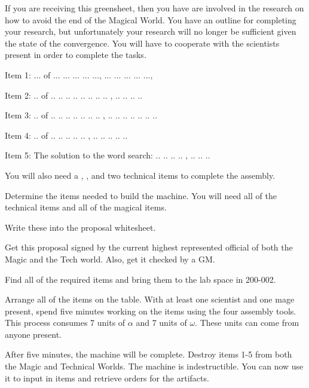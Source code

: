 \documentclass[green]{guildcamp3}
\begin{document}
\name{\gSaveTheWorldMages{}}






If you are receiving this greensheet, then you have are involved in the research on how to avoid the end of the Magical World. You have an outline for completing your research, but unfortunately your research will no longer be sufficient given the state of the convergence. You will have to cooperate with the scientists present in order to complete the tasks. 

Item 1: ... of ... ... ... ... ..., ... ... ... ... ...,

Item 2: .. of .. .. .. .. .. .. .. ..  ,  .. .. .. ..

Item 3: .. of .. .. .. .. .. .. ..  , .. .. .. .. .. .. ..

Item 4: .. of .. .. .. .. ..  ,  .. .. .. .. ..

Item 5: The solution to the word search: .. .. .. ..  ,  .. .. ..



You will also need a \iCauldron{}, \iPlumbicRod{}, and two technical items to complete the assembly. 


\begin{enum}[Directions]
  \item Determine the items needed to build the machine. You will need all of the technical items and all of the magical items. 
  \item Write these into the proposal whitesheet. 
  \item Get this proposal signed by the current highest represented official of both the Magic and the Tech world. Also, get it checked by a GM.
  \item Find all of the required items and bring them to the lab space in 200-002.
  \item Arrange all of the items on the table. With at least one scientist and one mage present, spend five minutes working on the items using the four assembly tools. This process consumes 7 units of $\alpha$ and 7 units of $\omega$. These units can come from anyone present. 
  \item After five minutes, the machine will be complete. Destroy items 1-5 from both the Magic and Technical Worlds. The machine is indestructible. You can now use it to input in items and retrieve orders for the artifacts. 
  
\end{enum}
\end{document}
